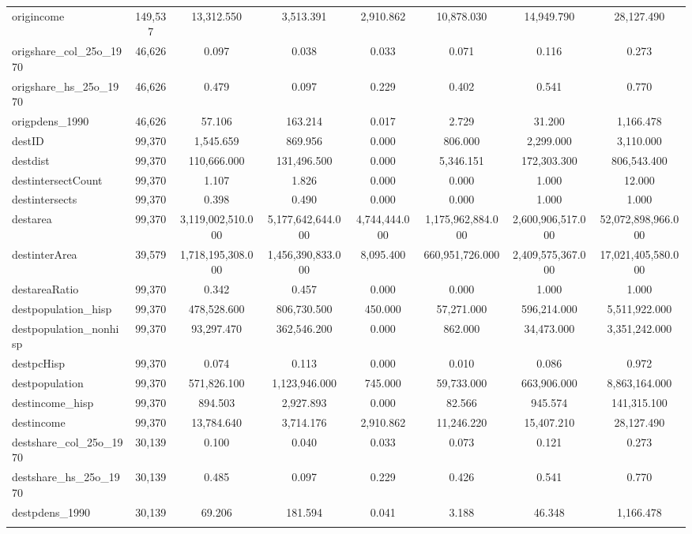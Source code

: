 \begin{table}[!htbp]
\begin{tabular}{@{\extracolsep{5pt}}lccccccc}
origincome & 149,537 & 13,312.550 & 3,513.391 & 2,910.862 & 10,878.030 & 14,949.790 & 28,127.490 \\ 
origshare\_col\_25o\_1970 & 46,626 & 0.097 & 0.038 & 0.033 & 0.071 & 0.116 & 0.273 \\ 
origshare\_hs\_25o\_1970 & 46,626 & 0.479 & 0.097 & 0.229 & 0.402 & 0.541 & 0.770 \\ 
origpdens\_1990 & 46,626 & 57.106 & 163.214 & 0.017 & 2.729 & 31.200 & 1,166.478 \\ 
destID & 99,370 & 1,545.659 & 869.956 & 0.000 & 806.000 & 2,299.000 & 3,110.000 \\ 
destdist & 99,370 & 110,666.000 & 131,496.500 & 0.000 & 5,346.151 & 172,303.300 & 806,543.400 \\ 
destintersectCount & 99,370 & 1.107 & 1.826 & 0.000 & 0.000 & 1.000 & 12.000 \\ 
destintersects & 99,370 & 0.398 & 0.490 & 0.000 & 0.000 & 1.000 & 1.000 \\ 
destarea & 99,370 & 3,119,002,510.000 & 5,177,642,644.000 & 4,744,444.000 & 1,175,962,884.000 & 2,600,906,517.000 & 52,072,898,966.000 \\ 
destinterArea & 39,579 & 1,718,195,308.000 & 1,456,390,833.000 & 8,095.400 & 660,951,726.000 & 2,409,575,367.000 & 17,021,405,580.000 \\ 
destareaRatio & 99,370 & 0.342 & 0.457 & 0.000 & 0.000 & 1.000 & 1.000 \\ 
destpopulation\_hisp & 99,370 & 478,528.600 & 806,730.500 & 450.000 & 57,271.000 & 596,214.000 & 5,511,922.000 \\ 
destpopulation\_nonhisp & 99,370 & 93,297.470 & 362,546.200 & 0.000 & 862.000 & 34,473.000 & 3,351,242.000 \\ 
destpcHisp & 99,370 & 0.074 & 0.113 & 0.000 & 0.010 & 0.086 & 0.972 \\ 
destpopulation & 99,370 & 571,826.100 & 1,123,946.000 & 745.000 & 59,733.000 & 663,906.000 & 8,863,164.000 \\ 
destincome\_hisp & 99,370 & 894.503 & 2,927.893 & 0.000 & 82.566 & 945.574 & 141,315.100 \\ 
destincome & 99,370 & 13,784.640 & 3,714.176 & 2,910.862 & 11,246.220 & 15,407.210 & 28,127.490 \\ 
destshare\_col\_25o\_1970 & 30,139 & 0.100 & 0.040 & 0.033 & 0.073 & 0.121 & 0.273 \\ 
destshare\_hs\_25o\_1970 & 30,139 & 0.485 & 0.097 & 0.229 & 0.426 & 0.541 & 0.770 \\ 
destpdens\_1990 & 30,139 & 69.206 & 181.594 & 0.041 & 3.188 & 46.348 & 1,166.478 \\ 
\hline \\[-1.8ex] 
\end{tabular} 
\end{table} 
